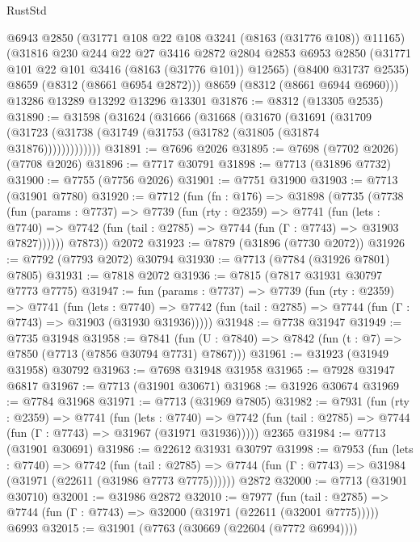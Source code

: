 \begin{lexlean}{RustStd}
\begin{coremodule}
      @6943
      @2850
      (@31771 @108 @22 @108 @3241 (@8163 (@31776 @108)) @11165)
      (@31816
        @230
        @244
        @22
        @27
        @3416
        @2872
        @2804
        @2853
        @6953
        @2850
        (@31771 @101 @22 @101 @3416 (@8163 (@31776 @101)) @12565)
        (@8400 @31737 @2535)
        @8659
        (@8312 (@8661 @6954 @2872)))
      @8659
      (@8312 (@8661 @6944 @6960)))
    @13286
    @13289
    @13292
    @13296
    @13301
@31876 := @8312 (@13305 @2535)
@31890 := @31598
    (@31624
      (@31666
        (@31668
          (@31670
            (@31691
              (@31709 (@31723 (@31738 (@31749 (@31753 (@31782 (@31805 (@31874 @31876)))))))))))))
@31891 := @7696 @2026
@31895 := @7698 (@7702 @2026) (@7708 @2026)
@31896 := @7717 @30791
@31898 := @7713 (@31896 @7732)
@31900 := @7755 (@7756 @2026)
@31901 := @7751 @31900
@31903 := @7713 (@31901 @7780)
@31920 := @7712
    (fun (fn : @176) =>
    @31898
      (@7735
        (@7738
          (fun (params : @7737) =>
          @7739
            (fun (rty : @2359) =>
            @7741
              (fun (lets : @7740) =>
              @7742 (fun (tail : @2785) => @7744 (fun (Γ : @7743) => @31903 @7827))))))
        @7873))
    @2072
@31923 := @7879 (@31896 (@7730 @2072))
@31926 := @7792 (@7793 @2072) @30794
@31930 := @7713 (@7784 (@31926 @7801) @7805)
@31931 := @7818 @2072
@31936 := @7815 (@7817 @31931 @30797 @7773 @7775)
@31947 := fun (params : @7737) =>
  @7739
    (fun (rty : @2359) =>
    @7741
      (fun (lets : @7740) =>
      @7742 (fun (tail : @2785) => @7744 (fun (Γ : @7743) => @31903 (@31930 @31936)))))
@31948 := @7738 @31947
@31949 := @7735 @31948
@31958 := @7841
    (fun (U : @7840) => @7842 (fun (t : @7) => @7850 (@7713 (@7856 @30794 @7731) @7867)))
@31961 := @31923 (@31949 @31958) @30792
@31963 := @7698 @31948 @31958
@31965 := @7928 @31947 @6817
@31967 := @7713 (@31901 @30671)
@31968 := @31926 @30674
@31969 := @7784 @31968
@31971 := @7713 (@31969 @7805)
@31982 := @7931
    (fun (rty : @2359) =>
    @7741
      (fun (lets : @7740) =>
      @7742 (fun (tail : @2785) => @7744 (fun (Γ : @7743) => @31967 (@31971 @31936)))))
    @2365
@31984 := @7713 (@31901 @30691)
@31986 := @22612 @31931 @30797
@31998 := @7953
    (fun (lets : @7740) =>
    @7742
      (fun (tail : @2785) =>
      @7744 (fun (Γ : @7743) => @31984 (@31971 (@22611 (@31986 @7773 @7775))))))
    @2872
@32000 := @7713 (@31901 @30710)
@32001 := @31986 @2872
@32010 := @7977
    (fun (tail : @2785) => @7744 (fun (Γ : @7743) => @32000 (@31971 (@22611 (@32001 @7775)))))
    @6993
@32015 := @31901 (@7763 (@30669 (@22604 (@7772 @6994))))

\end{coremodule}
\end{lexlean}
